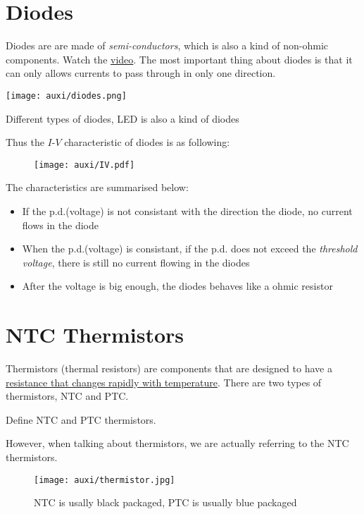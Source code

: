 \documentclass[a4paper]{tufte-handout}
\newenvironment{TaskBox} %
{\begin{tcolorbox}[breakable,colback=b1!30,colframe=b1,title=Task]} {\end{tcolorbox}}
\newenvironment{SummBox}
{\begin{tcolorbox}[breakable,colback=r1!30,colframe=r1,title=Summary]} {\end{tcolorbox}}
\begin{document}
\section{Diodes}
Diodes are are made of \emph{semi-conductors}, which is also a kind of non-ohmic components. Watch the \href{https://www.bilibili.com/video/BV1FX4y1T7Nz}{video}. The most important thing about diodes is that it can only allows currents to pass through in only one direction.
\begin{marginfigure}
\texttt{[image: auxi/diodes.png]}
\caption{Different types of diodes, LED is also a kind of diodes}
\end{marginfigure}

Thus the $I$-$V$ characteristic of diodes is as following:
\begin{figure}[h]
\centering
\texttt{[image: auxi/IV.pdf]}
\end{figure}

The characteristics are summarised below:
\begin{SummBox}
\begin{itemize}
  \item If the p.d.(voltage) is not consistant with the direction the diode, no current flows in the diode
  \item When the p.d.(voltage) is consistant, if the p.d. does not exceed the \emph{threshold voltage}, there is still no current flowing in the diodes
  \item After the voltage is big enough, the diodes behaves like a ohmic resistor
\end{itemize}
\end{SummBox}

\section{NTC Thermistors}
Thermistors (thermal resistors) are components that are designed to have a \uline{resistance that changes rapidly with temperature}. There are two types of thermistors, NTC and PTC.
\begin{TaskBox}
Define NTC and PTC thermistors.
\vspace{0.5in}
\end{TaskBox}
However, when talking about thermistors, we are actually referring to the NTC thermistors. 
\begin{figure}[h]
\centering
\texttt{[image: auxi/thermistor.jpg]}
\caption{NTC is usally black packaged, PTC is usually blue packaged}
\end{figure}
\end{document}
